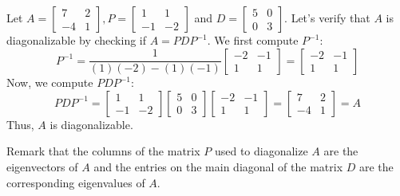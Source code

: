 \begin{eg}
    Let $A = \begin{bmatrix}
        7 & 2 \\ -4 & 1
    \end{bmatrix}, P = \begin{bmatrix}
        1 & 1 \\ -1 & -2
    \end{bmatrix}$ and $D = \begin{bmatrix}
        5 & 0 \\ 0 & 3
    \end{bmatrix}$. Let's verify that $A$ is diagonalizable by checking if $A = P D P^{-1}$. We first compute $P^{-1}$:
    \[P^{-1} = \frac{1}{(1)(-2) - (1)(-1)} \begin{bmatrix}
        -2 & -1 \\ 1 & 1
    \end{bmatrix} = \begin{bmatrix}
        -2 & -1 \\ 1 & 1
    \end{bmatrix}\]
    Now, we compute $P D P^{-1}$:
    \[P D P^{-1} = \begin{bmatrix}
        1 & 1 \\ -1 & -2
    \end{bmatrix} \begin{bmatrix}
        5 & 0 \\ 0 & 3
    \end{bmatrix} \begin{bmatrix}
        -2 & -1 \\ 1 & 1
    \end{bmatrix} = \begin{bmatrix}
        7 & 2 \\ -4 & 1
    \end{bmatrix} = A\]
    Thus, $A$ is diagonalizable.
\end{eg}
Remark that the columns of the matrix $P$ used to diagonalize $A$ are the eigenvectors of $A$ and the entries on the main diagonal of the matrix $D$ are the corresponding eigenvalues of $A$.

